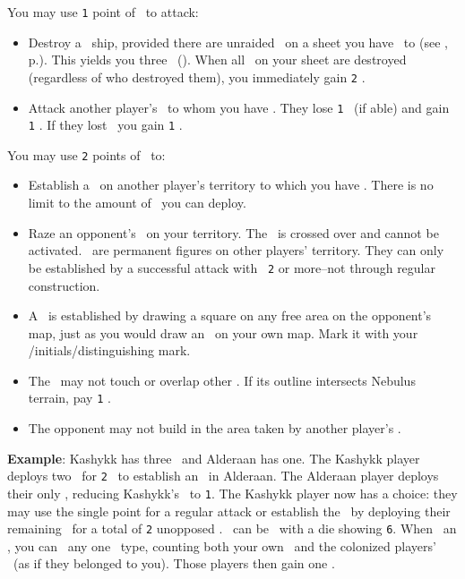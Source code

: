 You may use \texttt{1} point of \power\ to attack:
\begin{itemize}
  \item Destroy a \pirate\ ship, provided there are unraided \pirates\ on a sheet you have \reach\ to (see , p.\pageref{sec:reach}).  This yields you three \currency\ (\gaincurrency\gaincurrency\gaincurrency).  When all \pirates\ on your sheet are destroyed (regardless of who destroyed them), you immediately gain \texttt{2} \happiness.
  \item Attack another player's \planet\ to whom you have \reach.  They lose \texttt{1} \currency\ (if able) and gain \texttt{1} \unhappiness. If they lost \currency\, you gain \texttt{1} \currency.
\end{itemize}
You may use \texttt{2} points of \power\ to:
\begin{itemize}
  \item Establish a \battleship\ on another player's territory to which you have \reach.  There is no limit to the amount of \battleships\ you can deploy.
  \item Raze an opponent's \battleship\ on your territory.  The \battleship\ is crossed over and cannot be activated.  \battleships\ are permanent figures on other players' territory.  They can only be established by a successful attack with \power\ \texttt{2} or more--not through regular construction.
  \item A \battleship\ is established by drawing a square on any free area on the opponent's map, just as you would draw an \armament\ on your own map.  Mark it with your \insignia/initials/distinguishing mark.
  \item The \battleship\ may not touch or overlap other \armaments.  If its outline intersects Nebulus terrain, pay \texttt{1} \currency.
  \item The opponent may not build in the area taken by another player's \battleship.
\end{itemize}
\textbf{Example}: Kashykk has three \squadrons\ and Alderaan has one.  
The Kashykk player deploys two \squadrons\ for \texttt{2} \power\ to establish an \battleship\ in Alderaan.  
The Alderaan player deploys their only \squadron, reducing Kashykk's \power\ to \texttt{1}.  
The Kashykk player now has a choice: they may use the single point for a regular attack or establish the \battleship\ by deploying their remaining \squadron\ for a total of \texttt{2} unopposed \power.
\newline\newline
\battleships\ can be \activated\ with a die showing \texttt{6}. 
When \activating\ an \battleship, you can \activate\ any one \armament\ type, counting both your own \armament\ and the colonized players' \armaments\ (as if they belonged to you).  
Those players then gain one \unhappiness.
